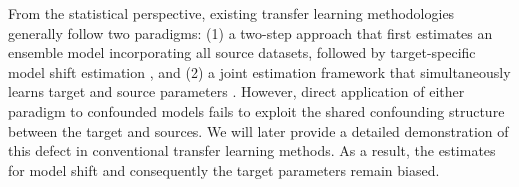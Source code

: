 \documentclass[12pt]{article}
\begin{document}

From the statistical perspective, existing transfer learning methodologies generally follow two paradigms: (1) a two-step approach that first estimates an ensemble model incorporating all source datasets, followed by target-specific model shift estimation \citep{li2022transfer,tian2023transfer,cai2024transferb}, and (2) a joint estimation framework that simultaneously learns target and source parameters \citep{he2024adatrans,li2024estimation}. 
However, direct application of either paradigm to confounded models fails to exploit the shared confounding structure between the target and sources. We will later provide a detailed demonstration of this defect in conventional transfer learning methods. As a result, the estimates for model shift and consequently the target parameters remain biased. 

\end{document}
